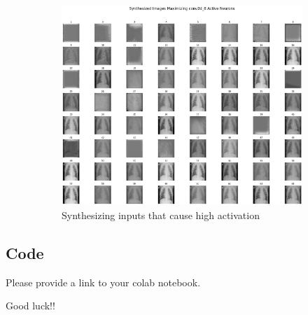 \documentclass{article}
\begin{document}
\begin{figure}
\begin{subfigure}[b]{0.25\textwidth}
         \includegraphics[width=1.1\linewidth, angle=0]{synth_images.png}
          \caption{Synthesizing inputs that cause high activation}
          \label{fig:synth_images}
     \end{subfigure}
     
        \caption{}
        \label{fig:three Explainability approaches}
\end{figure}


\subsection{Code}

Please provide a link to your colab notebook.

Good luck!!


\end{document}
